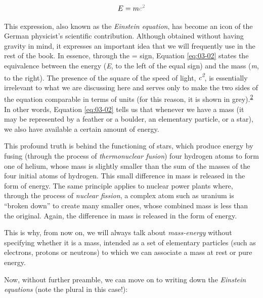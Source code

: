 \begin{equation}\label{eq:03-02}
E = m\textcolor{gray}{c^{2}}
\end{equation}

This expression, also known as the \emph{Einstein equation}, has
become an icon of the German physicist's scientific contribution. Although obtained
without having gravity in mind, it expresses an important idea that we will frequently
use in the rest of the book. In essence, through the = sign, Equation \eqref{eq:03-02} states the
equivalence between the
energy (\emph{E}, to the
left of the equal sign) and the mass (\emph{m}, to the right). The presence of the
square of the speed of light, \emph{c\textsuperscript{2}}, is essentially irrelevant to
what we are discussing here and serves only to make the two sides of the equation
comparable in terms of units (for this reason, it is shown in grey).\textsuperscript{\hyperlink{note:03-02}{2}}
In other words, Equation \eqref{eq:03-02} tells us that whenever we have a mass (it may be
represented by a feather or a boulder, an elementary particle, or a star), we also have
available a certain amount of energy.

This profound truth is behind the functioning of stars, which produce energy by fusing
(through the process of \emph{thermonuclear fusion}) four hydrogen
atoms to form one of helium, whose mass is slightly smaller than the sum of the masses
of the four initial atoms of hydrogen. This small difference in mass is released in the
form of energy. The same principle applies to nuclear power plants where, through the
process of \emph{nuclear fission}, a complex atom such as uranium is ``broken down'' to
create many smaller ones, whose combined mass is less than the original. Again, the
difference in mass is released in the form of energy.

This is why, from now on, we will always talk about \emph{mass-energy}
without specifying whether it is a mass,
intended as a set of elementary particles (such as electrons, protons or neutrons) to
which we can associate a mass at rest or pure energy.

Now, without further preamble, we can move on to writing down the \emph{Einstein
equation}\emph{s} (note the plural in this case!):

